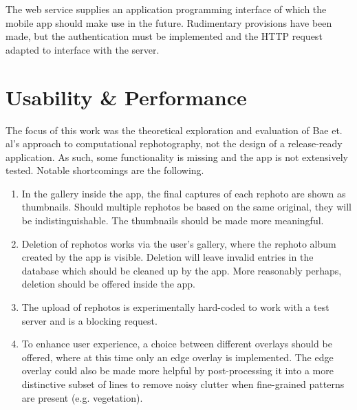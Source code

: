 The web service supplies an application programming interface of which the mobile
app should make use in the future. Rudimentary provisions have been made, but
the authentication must be implemented and the HTTP request adapted to interface
with the server.

\section{Usability \& Performance}

The focus of this work was the theoretical exploration and evaluation of Bae et.
al's approach to computational rephotography, not the design of a release-ready
application. As such, some functionality is missing and the app is not
extensively tested. Notable shortcomings are the following.
\begin{enumerate}
   \item In the gallery inside the app, the final captures of each rephoto are
      shown as thumbnails. Should multiple rephotos be based on the same
      original, they will be indistinguishable. The thumbnails should be made
      more meaningful.

   \item Deletion of rephotos works via the user's gallery, where the rephoto
      album created by the app is visible. Deletion will leave invalid entries
      in the database which should be cleaned up by the app. More reasonably
      perhaps, deletion should be offered inside the app.


   \item The upload of rephotos is experimentally hard-coded to work with a test
      server and is a blocking request.

   \item To enhance user experience, a choice between different overlays should
      be offered, where at this time only an edge overlay is implemented. The
      edge overlay could also be made more helpful by post-processing it into a
      more distinctive subset of lines to remove noisy clutter when fine-grained
      patterns are present (e.g. vegetation).


\end{enumerate}
